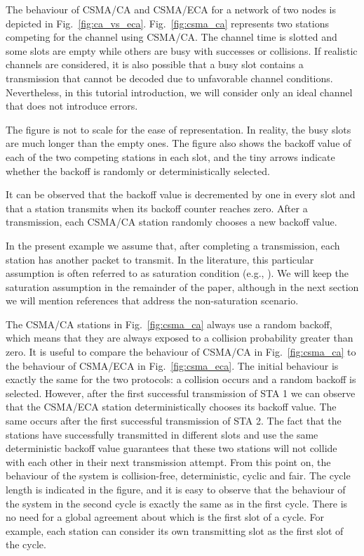 \documentclass[journal]{IEEEtran}
\begin{document}
The behaviour of CSMA/CA and CSMA/ECA for a network of two nodes is depicted in Fig.~\ref{fig:ca_vs_eca}.
Fig.~\ref{fig:csma_ca} represents two stations competing for the channel using CSMA/CA.
The channel time is slotted and some slots are empty while others are busy with successes or collisions.
If realistic channels are considered, it is also possible that a busy slot contains a transmission that cannot be decoded due to unfavorable channel conditions.
Nevertheless, in this tutorial introduction, we will consider only an ideal channel that does not introduce errors.

The figure is not to scale for the ease of representation.
In reality, the busy slots are much longer than the empty ones. 
The figure also shows the backoff value of each of the two competing stations in each slot, and the tiny arrows indicate whether the backoff is randomly or deterministically selected.

It can be observed that the backoff value is decremented by one in every slot and that a station transmits when its backoff counter reaches zero.
After a transmission, each CSMA/CA station randomly chooses a new backoff value.

In the present example we assume that, after completing a transmission, each station has another packet to transmit.
In the literature, this particular assumption is often referred to as saturation condition (e.g., \cite{he2009srb,barcelo2010fcc,fang2011dlm,barcelo2011tcf}).
We will keep the saturation assumption in the remainder of the paper, although in the next section we will mention references that address the non-saturation scenario.

The CSMA/CA stations in Fig.~\ref{fig:csma_ca} always use a random backoff, which means that they are always exposed to a collision probability greater than zero.
It is useful to compare the behaviour of CSMA/CA in Fig.~\ref{fig:csma_ca} to the behaviour of CSMA/ECA in Fig.~\ref{fig:csma_eca}.
The initial behaviour is exactly the same for the two protocols: a collision occurs and a random backoff is selected.
However, after the first successful transmission of STA 1 we can observe that the CSMA/ECA station deterministically chooses its backoff value.
The same occurs after the first successful transmission of STA 2.
The fact that the stations have successfully transmitted in different slots and use the same deterministic backoff value guarantees that these two stations will not collide with each other in their next transmission attempt.
From this point on, the behaviour of the system is collision-free, deterministic, cyclic and fair.
The cycle length is indicated in the figure, and it is easy to observe that the behaviour of the system in the second cycle is exactly the same as in the first cycle.
There is no need for a global agreement about which is the first slot of a cycle.
For example, each station can consider its own transmitting slot as the first slot of the cycle.
\end{document}
